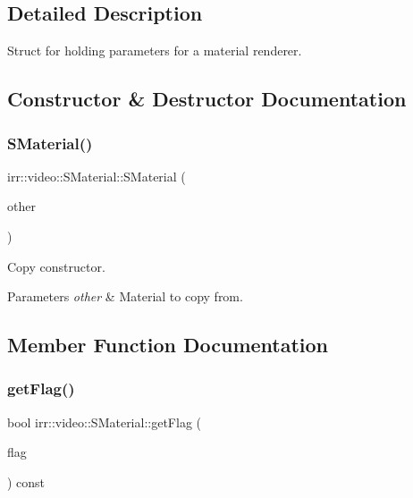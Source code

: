 \subsection{Detailed Description}
Struct for holding parameters for a material renderer. 

\subsection{Constructor \& Destructor Documentation}
\mbox{\label{classirr_1_1video_1_1SMaterial_a66f175294b99e3cc2816e9cc0f372ce3}} 
\subsubsection{\texorpdfstring{S\+Material()}{SMaterial()}}
{\footnotesize\ttfamily irr\+::video\+::\+S\+Material\+::\+S\+Material (\begin{DoxyParamCaption}\item[{const \hyperlink{classirr_1_1video_1_1SMaterial}{S\+Material} \&}]{other }\end{DoxyParamCaption})\hspace{0.3cm}{\ttfamily [inline]}}



Copy constructor. 


\begin{DoxyParams}{Parameters}
{\em other} & Material to copy from. \\
\hline
\end{DoxyParams}


\subsection{Member Function Documentation}
\mbox{\label{classirr_1_1video_1_1SMaterial_a3811e59a69983b4a7fce2d8e7aaf91f1}} 
\subsubsection{\texorpdfstring{get\+Flag()}{getFlag()}}
{\footnotesize\ttfamily bool irr\+::video\+::\+S\+Material\+::get\+Flag (\begin{DoxyParamCaption}\item[{\hyperlink{namespaceirr_1_1video_a8a3bc00ae8137535b9fbc5f40add70d3}{E\+\_\+\+M\+A\+T\+E\+R\+I\+A\+L\+\_\+\+F\+L\+AG}}]{flag }\end{DoxyParamCaption}) const\hspace{0.3cm}{\ttfamily [inline]}}



